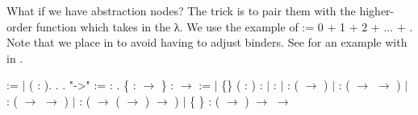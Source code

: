  What if we have abstraction nodes?  The trick is to pair them
      with the higher-order function which takes in the λ.  We use the
      example of    :=  0 +  1 +  2 + ... +  .  Note
      that we place  in  to avoid having to adjust 
      binders.  See  for an example with  in
      . \begin{coqdoccode}
\coqdocemptyline
\coqdocindent{1.00em}
  :=  \ensuremath{|}  (  : ).\coqdoceol
\coqdocindent{1.00em}
    .\coqdoceol
\coqdocindent{1.00em}
    .\coqdoceol
\coqdocindent{1.00em}
 "->" :=  : .\coqdoceol
\coqdocindent{1.00em}
  \{ :  \ensuremath{\rightarrow} \} :  \ensuremath{\rightarrow}  :=\coqdoceol
\coqdocindent{1.00em}
\ensuremath{|}  \{\} ( :  ) :  \coqdoceol
\coqdocindent{1.00em}
\ensuremath{|}  :  \coqdoceol
\coqdocindent{1.00em}
\ensuremath{|}  :  ( \ensuremath{\rightarrow} )\coqdoceol
\coqdocindent{1.00em}
\ensuremath{|}  :  ( \ensuremath{\rightarrow}  \ensuremath{\rightarrow} )\coqdoceol
\coqdocindent{1.00em}
\ensuremath{|}  :  ( \ensuremath{\rightarrow}  \ensuremath{\rightarrow} )\coqdoceol
\coqdocindent{1.00em}
\ensuremath{|}  :  ( \ensuremath{\rightarrow} ( \ensuremath{\rightarrow} ) \ensuremath{\rightarrow} )\coqdoceol
\coqdocindent{1.00em}
\ensuremath{|}  \{ \} :  ( \ensuremath{\rightarrow} ) \ensuremath{\rightarrow}   \ensuremath{\rightarrow}  \coqdoceol

\end{coqdoccode}

